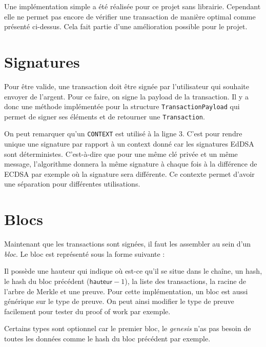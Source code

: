Une implémentation simple a été réalisée pour ce projet sans librairie. Cependant elle ne permet pas encore de vérifier une transaction de manière optimal comme présenté ci-dessus. Cela fait partie d'une amélioration possible pour le projet.

\section{Signatures}
\label{sec:signature}

Pour être valide, une transaction doit être signée par l'utilisateur qui souhaite envoyer de l'argent. Pour ce faire, on signe la payload de la transaction. Il y a donc une méthode implémentée pour la structure \verb|TransactionPayload| qui permet de signer ses éléments et de retourner une \verb|Transaction|.


On peut remarquer qu'un \verb|CONTEXT| est utilisé à la ligne 3. C'est pour rendre unique une signature par rapport à un context donné car les signatures EdDSA sont déterministes. C'est-à-dire que pour une même clé privée et un même message, l'algorithme donnera la même signature à chaque fois à la différence de ECDSA par exemple où la signature sera différente. Ce contexte permet d'avoir une séparation pour différentes utilisations.

\section{Blocs}

Maintenant que les transactions sont signées, il faut les assembler au sein d'un \emph{bloc}. Le bloc est représenté sous la forme suivante :


Il possède une hauteur qui indique où est-ce qu'il se situe dans le chaîne, un hash, le hash du bloc précédent ($\mathsf{hauteur} - 1$), la liste des transactions, la racine de l'arbre de Merkle et une preuve. Pour cette implémentation, un bloc est aussi générique sur le type de preuve. On peut ainsi modifier le type de preuve facilement pour tester du proof of work par exemple.

Certains types sont optionnel car le premier bloc, le \emph{genesis} n'as pas besoin de toutes les données comme le hash du bloc précédent par exemple.

